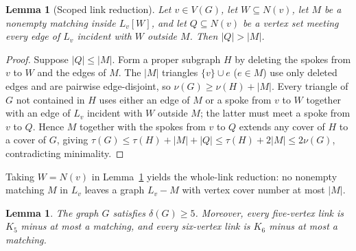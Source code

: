 \documentclass[11pt]{article}
\newtheorem{lemma}[theorem]{Lemma}
\begin{document}
\begin{lemma}[Scoped link reduction]\label{lem:scoped}
Let $v\in V(G)$, let $W\subseteq N(v)$, let $M$ be a nonempty matching inside $L_v[W]$, and let $Q\subseteq N(v)$ be a vertex set meeting every edge of $L_v$ incident with $W$ outside $M$. Then $|Q|>|M|$.
\end{lemma}

\begin{proof}
Suppose $|Q|\leq |M|$. Form a proper subgraph $H$ by deleting the spokes from $v$ to $W$ and the edges of $M$. The $|M|$ triangles $\{v\}\cup e$ ($e\in M$) use only deleted edges and are pairwise edge-disjoint, so $\nu(G)\geq\nu(H)+|M|$. Every triangle of $G$ not contained in $H$ uses either an edge of $M$ or a spoke from $v$ to $W$ together with an edge of $L_v$ incident with $W$ outside $M$; the latter must meet a spoke from $v$ to $Q$. Hence $M$ together with the spokes from $v$ to $Q$ extends any cover of $H$ to a cover of $G$, giving $\tau(G)\leq\tau(H)+|M|+|Q|\leq\tau(H)+2|M|\leq 2\nu(G)$, contradicting minimality.
\end{proof}

Taking $W=N(v)$ in Lemma~\ref{lem:scoped} yields the whole-link reduction: no nonempty matching $M$ in $L_v$ leaves a graph $L_v-M$ with vertex cover number at most $|M|$.

\begin{lemma}\label{lem:small-links}
The graph $G$ satisfies $\delta(G)\geq 5$. Moreover, every five-vertex link is $K_5$ minus at most a matching, and every six-vertex link is $K_6$ minus at most a matching.
\end{lemma}
\end{document}
